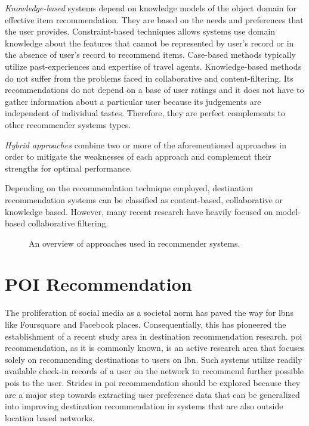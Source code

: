 \textit{Knowledge-based} systems \parencite{Burke2000Knowledge-basedSystems} depend on knowledge models of the object domain for effective item recommendation. They are based on the needs and preferences that the user provides. Constraint-based techniques \parencite{Choi2021ATourismcity} allows systems use domain knowledge about the features that cannot be represented by user's record or in the absence of user's record to recommend items. Case-based methods\parencite{Montejo-Raez2011Otium:Leisure} typically utilize past-experiences and expertise of travel agents. Knowledge-based methods do not suffer from the problems faced in collaborative and content-filtering. Its recommendations do not depend on a base of user ratings and it does not have to gather information about a particular user because its
judgements are independent of individual tastes\parencite{Burke2000Knowledge-basedSystems}. Therefore, they are perfect complements to other recommender systems types. 

\textit{Hybrid approaches}\parencite{Adomavicius2005TowardExtensions,Ghazanfar2010BuildingFiltering} combine two or more of the aforementioned approaches in order to mitigate the weaknesses of each approach and complement their strengths for optimal performance. 

Depending on the recommendation technique employed, destination recommendation systems can be classified as content-based, collaborative or knowledge based. However, many recent research have heavily focused on model-based collaborative filtering.


\begin{figure}[htpb]
  \centering
   
    \caption[Recommender Systems Approaches Overview]{An overview of approaches used in recommender systems.}\label{fig:recSystems-approaches}
\end{figure}

\section{POI Recommendation}
The proliferation of social media as a societal norm has paved the way for \Glspl{lbn} like Foursquare and Facebook places. Consequentially, this has pioneered the establishment of a recent study area in destination recommendation research. \gls{poi} recommendation, as it is commonly known, is an active research area that focuses solely on recommending destinations to users on \gls{lbn}. Such systems utilize readily available check-in records of a user on the network to recommend further possible \glspl{poi} to the user. Strides in \gls{poi} recommendation should be explored because they are a major step towards extracting user preference data that can be generalized into improving destination recommendation in systems that are also outside location based networks.

